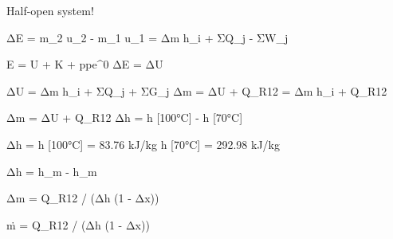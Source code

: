 Half-open system!  

ΔE = m_2 u_2 - m_1 u_1 = Δm h_i + ΣQ_j - ΣW_j  

E = U + K + ppe^0  
ΔE = ΔU  

ΔU = Δm h_i + ΣQ_j + ΣG_j  
Δm = ΔU + Q_R12 = Δm h_i + Q_R12  

Δm = ΔU + Q_R12  
Δh = h [100°C] - h [70°C]  

Δh = h [100°C] = 83.76 kJ/kg  
h [70°C] = 292.98 kJ/kg  

Δh = h_m - h_m  

Δm = Q_R12 / (Δh (1 - Δx))  

ṁ = Q_R12 / (Δh (1 - Δx))